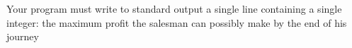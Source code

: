 Your program must write to standard output a single line containing a single integer: the maximum profit the salesman can possibly make by the end of his journey